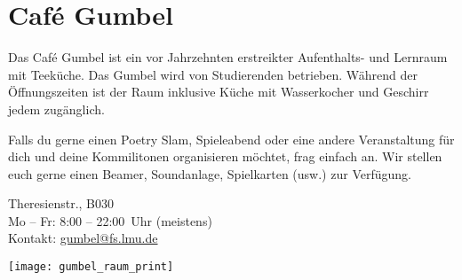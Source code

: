 ﻿
\section{Café Gumbel}

Das Café Gumbel ist ein vor Jahrzehnten erstreikter Aufenthalts- und Lernraum mit Teeküche.  Das Gumbel wird von Studierenden betrieben.  Während der
Öffnungszeiten ist der Raum inklusive Küche mit Wasserkocher und Geschirr
jedem zugänglich.

Falls du gerne einen Poetry Slam, Spieleabend oder
eine andere Veranstaltung für dich und deine Kommilitonen organisieren
möchtet, frag einfach an.  Wir stellen euch gerne einen Beamer, Soundanlage,
Spielkarten (usw.) zur Verfügung.

Theresienstr., B030\\
Mo -- Fr: 8:00 -- 22:00~Uhr (meistens)\\
Kontakt: \url{gumbel@fs.lmu.de}

\skiptobottom
\texttt{[image: gumbel\_raum\_print]}
